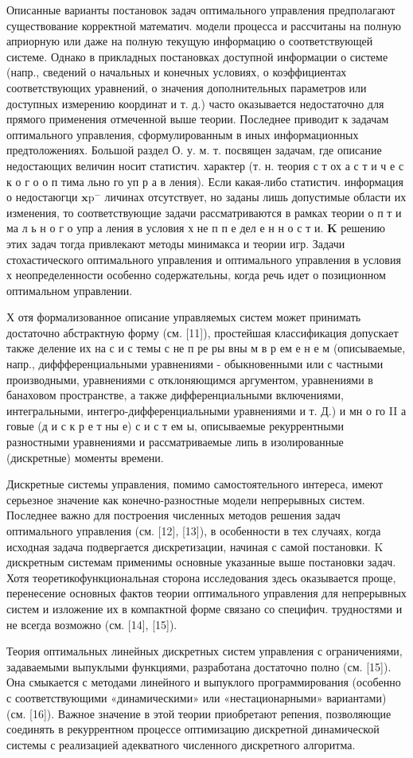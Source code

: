 \documentclass[10pt]{article}
\begin{document}
Описанные варианты постановок задач оптимального управления предполагают существование корректной математич. модели процесса и рассчитаны на полную априорную или даже на полную текущую информацию о соответствующей системе. Однако в прикладных постановках доступной информации о системе (напр., сведений о начальных и конечных условиях, о коэффициентах соответствующих уравнений, о значения дополнительных параметров или доступных измерению координат и т. д.) часто оказывается недостаточно для прямого применения отмеченной выше теории. Последнее приводит к задачам оптимального управления, сформулированным в иных информационных предтоложениях. Большой раздел О. у. м. т. посвящен задачам, где описание недостающих величин носит статистич. характер (т. н. теория с т ох а с т и ч е с к о г о о п тима льно го уп р а в ления). Если какая-либо статистич. информация о недостаюгци $\mathbf{x} \mathrm{p}^{-}$ личинах отсутствует, но заданы лишь допустимые области их изменения, то соответствующие задачи рассматриваются в рамках теории о п т и ма л ь н о г о упр а ления в условия х не п п е дел е н н о с т и. $\boldsymbol{K}$ решению этих задач тогда привлекают методы минимакса и теории игр. Задачи стохастического оптимального управления и оптимального управления в условия х неопределенности особенно содержательны, когда речь идет о позиционном оптимальном управлении.

Х отя формализованное описание управляемых систем может принимать достаточно абстрактную форму (см. [11]), простейшая классификация допускает также деление их на с и с темы с не п ре ры вны м в р ем е н е м (описываемые, напр., диффференциальными уравнениями - обыкновенными или с частными производными, уравнениями с отклоняющимся аргументом, уравнениями в банаховом пространстве, а также дифференциальными включениями, интегральными, интегро-дифференциальными уравнениями и т. Д.) и мн о го II а говые (д и с к р е т ны е) с и с т ем ы, описываемые рекуррентными разностными уравнениями и рассматриваемые липь в изолированные (дискретные) моменты времени.

Дискретные системы управления, помимо самостоятельного интереса, имеют серьезное значение как конечно-разностные модели непрерывных систем. Последнее важно для построения численных методов решения задач оптимального управления (см. [12], [13]), в особенности в тех случаях, когда исходная задача подвергается дискретизации, начиная с самой постановки. $\mathrm{K}$ дискретным системам применимы основные указанные выше постановки задач. Хотя теоретикофункциональная сторона исследования здесь оказывается проще, перенесение основных фактов теории оптимального управления для непрерывных систем и изложение их в компактной форме связано со специфич. трудностями и не всегда возможно (см. [14], [15]).

Теория оптимальных линейных дискретных систем управления с ограничениями, задаваемыми выпуклыми функциями, разработана достаточно полно (см. [15]). Она смыкается с методами линейного и выпуклого программирования (особенно с соответствующими «динамическими» или «нестационарными» вариантами) (см. [16]). Важное значение в этой теории приобретают репения, позволяющие соединять в рекуррентном процессе оптимизацию дискретной динамической системы с реализацией адекватного численного дискретного алгоритма.
\end{document}
